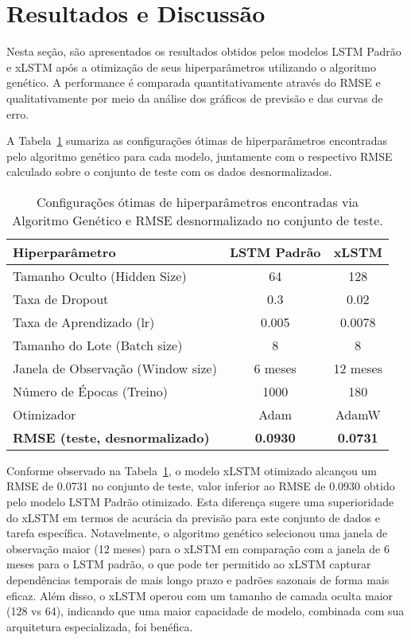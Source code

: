 \documentclass[conference]{IEEEtran}
\begin{document}
\section{Resultados e Discussão}
\label{sec:resultados}
Nesta seção, são apresentados os resultados obtidos pelos modelos LSTM Padrão e xLSTM após a otimização de seus hiperparâmetros utilizando o algoritmo genético. A performance é comparada quantitativamente através do RMSE e qualitativamente por meio da análise dos gráficos de previsão e das curvas de erro.

A Tabela~\ref{tab:resultados_comparativos} sumariza as configurações ótimas de hiperparâmetros encontradas pelo algoritmo genético para cada modelo, juntamente com o respectivo RMSE calculado sobre o conjunto de teste com os dados desnormalizados.

\begin{table}[htbp]
\caption{Configurações ótimas de hiperparâmetros encontradas via Algoritmo Genético e RMSE desnormalizado no conjunto de teste.}
\begin{center}
\begin{tabular}{@{}lcc@{}}
\toprule
\textbf{Hiperparâmetro} & \textbf{LSTM Padrão} & \textbf{xLSTM} \\
\midrule
Tamanho Oculto (Hidden Size) & 64 & 128 \\
Taxa de Dropout & 0.3 & 0.02 \\
Taxa de Aprendizado (lr) & 0.005 & 0.0078 \\
Tamanho do Lote (Batch size) & 8 & 8 \\
Janela de Observação (Window size) & 6 meses & 12 meses \\
Número de Épocas (Treino) & 1000 & 180 \\
Otimizador & Adam & AdamW \\
\midrule
\textbf{RMSE (teste, desnormalizado)} & \textbf{0.0930} & \textbf{0.0731} \\
\bottomrule
\end{tabular}
\label{tab:resultados_comparativos}
\end{center}
\end{table}

Conforme observado na Tabela~\ref{tab:resultados_comparativos}, o modelo xLSTM otimizado alcançou um RMSE de 0.0731 no conjunto de teste, valor inferior ao RMSE de 0.0930 obtido pelo modelo LSTM Padrão otimizado. Esta diferença sugere uma superioridade do xLSTM em termos de acurácia da previsão para este conjunto de dados e tarefa específica. Notavelmente, o algoritmo genético selecionou uma janela de observação maior (12 meses) para o xLSTM em comparação com a janela de 6 meses para o LSTM padrão, o que pode ter permitido ao xLSTM capturar dependências temporais de mais longo prazo e padrões sazonais de forma mais eficaz. Além disso, o xLSTM operou com um tamanho de camada oculta maior (128 vs 64), indicando que uma maior capacidade de modelo, combinada com sua arquitetura especializada, foi benéfica.
\end{document}
